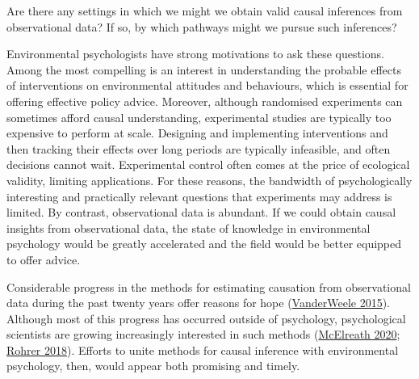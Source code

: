 \documentclass[
  singlecolumn]{article}
\begin{document}
Are there any settings in which we might we obtain valid causal
inferences from observational data? If so, by which pathways might we
pursue such inferences?

Environmental psychologists have strong motivations to ask these
questions. Among the most compelling is an interest in understanding the
probable effects of interventions on environmental attitudes and
behaviours, which is essential for offering effective policy advice.
Moreover, although randomised experiments can sometimes afford causal
understanding, experimental studies are typically too expensive to
perform at scale. Designing and implementing interventions and then
tracking their effects over long periods are typically infeasible, and
often decisions cannot wait. Experimental control often comes at the
price of ecological validity, limiting applications. For these reasons,
the bandwidth of psychologically interesting and practically relevant
questions that experiments may address is limited. By contrast,
observational data is abundant. If we could obtain causal insights from
observational data, the state of knowledge in environmental psychology
would be greatly accelerated and the field would be better equipped to
offer advice.

Considerable progress in the methods for estimating causation from
observational data during the past twenty years offer reasons for hope
(\protect\hyperlink{ref-vanderweele2015}{VanderWeele 2015}). Although
most of this progress has occurred outside of psychology, psychological
scientists are growing increasingly interested in such methods
(\protect\hyperlink{ref-mcelreath2020}{McElreath 2020};
\protect\hyperlink{ref-rohrer2018}{Rohrer 2018}). Efforts to unite
methods for causal inference with environmental psychology, then, would
appear both promising and timely.
\end{document}
